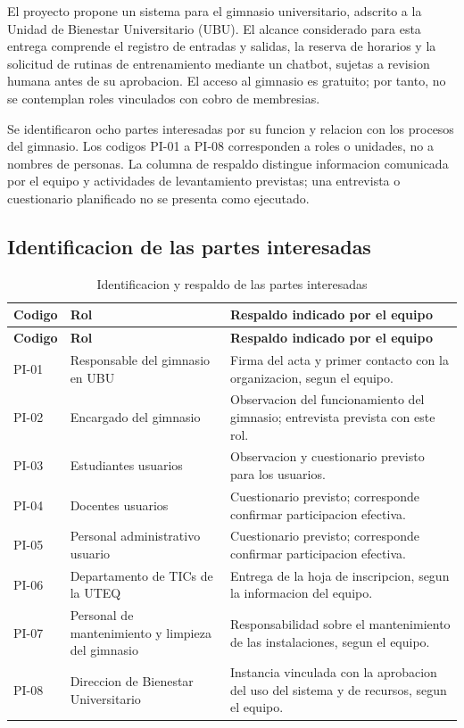 El proyecto propone un sistema para el gimnasio universitario, adscrito a la Unidad de Bienestar Universitario (UBU). El alcance considerado para esta entrega comprende el registro de entradas y salidas, la reserva de horarios y la solicitud de rutinas de entrenamiento mediante un chatbot, sujetas a revision humana antes de su aprobacion. El acceso al gimnasio es gratuito; por tanto, no se contemplan roles vinculados con cobro de membresias.

Se identificaron ocho partes interesadas por su funcion y relacion con los procesos del gimnasio. Los codigos PI-01 a PI-08 corresponden a roles o unidades, no a nombres de personas. La columna de respaldo distingue informacion comunicada por el equipo y actividades de levantamiento previstas; una entrevista o cuestionario planificado no se presenta como ejecutado.

\subsection{Identificacion de las partes interesadas}
\begingroup
\small
\renewcommand{\arraystretch}{1.18}
\begin{longtable}{|p{1.35cm}|p{4.0cm}|p{7.85cm}|}
\caption{Identificacion y respaldo de las partes interesadas}\label{tab:identificacion-pi}\\\hline
\textbf{Codigo} & \textbf{Rol} & \textbf{Respaldo indicado por el equipo} \\ \hline
\endfirsthead
\hline \textbf{Codigo} & \textbf{Rol} & \textbf{Respaldo indicado por el equipo} \\ \hline
\endhead
PI-01 & Responsable del gimnasio en UBU & Firma del acta y primer contacto con la organizacion, segun el equipo. \\ \hline
PI-02 & Encargado del gimnasio & Observacion del funcionamiento del gimnasio; entrevista prevista con este rol. \\ \hline
PI-03 & Estudiantes usuarios & Observacion y cuestionario previsto para los usuarios. \\ \hline
PI-04 & Docentes usuarios & Cuestionario previsto; corresponde confirmar participacion efectiva. \\ \hline
PI-05 & Personal administrativo usuario & Cuestionario previsto; corresponde confirmar participacion efectiva. \\ \hline
PI-06 & Departamento de TICs de la UTEQ & Entrega de la hoja de inscripcion, segun la informacion del equipo. \\ \hline
PI-07 & Personal de mantenimiento y limpieza del gimnasio & Responsabilidad sobre el mantenimiento de las instalaciones, segun el equipo. \\ \hline
PI-08 & Direccion de Bienestar Universitario & Instancia vinculada con la aprobacion del uso del sistema y de recursos, segun el equipo. \\ \hline
\end{longtable}
\endgroup

